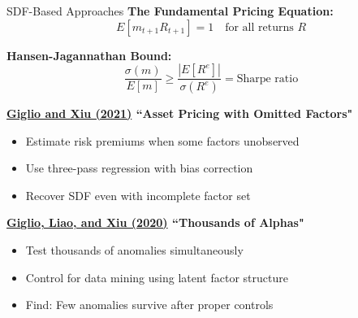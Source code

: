 \documentclass{beamer}
\begin{document}
\begin{frame}{SDF-Based Approaches}
    \textbf{The Fundamental Pricing Equation:}
    \begin{equation*}
        E[m_{t+1} R_{t+1}] = 1 \quad \text{for all returns } R
    \end{equation*}
    
    \textbf{Hansen-Jagannathan Bound:}
    \begin{equation*}
        \frac{\sigma(m)}{E[m]} \geq \frac{|E[R^e]|}{\sigma(R^e)} = \text{Sharpe ratio}
    \end{equation*}
    
    
    \textbf{\textcolor{blue}{\href{https://doi.org/10.1086/714090}{Giglio and Xiu (2021)}} ``Asset Pricing with Omitted Factors"}
    \begin{itemize}
        \item Estimate risk premiums when some factors unobserved
        \item Use three-pass regression with bias correction
        \item Recover SDF even with incomplete factor set
    \end{itemize}
    
    
    \textbf{\textcolor{blue}{\href{https://doi.org/10.1093/rfs/hhaa111}{Giglio, Liao, and Xiu (2020)}} ``Thousands of Alphas"}
    \begin{itemize}
        \item Test thousands of anomalies simultaneously
        \item Control for data mining using latent factor structure
        \item Find: Few anomalies survive after proper controls
    \end{itemize}
\end{frame}
\end{document}
